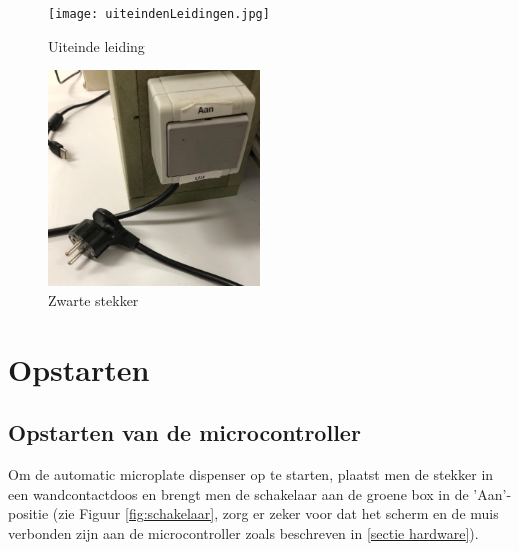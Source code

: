\documentclass[a4paper,twoside,kulak]{kulakreport} %
\begin{document}
\begin{figure}[h]
	\centering
	\texttt{[image: uiteindenLeidingen.jpg]}
	\caption{Uiteinde leiding}
	\label{fig: uiteinde leiding}
	
\end{figure} 

\begin{figure}[h]
	\centering
	\includegraphics[width=0.5\textwidth]{stekker.png}
	\caption{Zwarte stekker}
	\label{fig:stekker}
	
\end{figure} 


\chapter*{Opstarten}
\label{hoofdstuk opstarten}
\section*{Opstarten van de microcontroller}
Om de automatic microplate dispenser op te starten, plaatst men de stekker in een wandcontactdoos en brengt men de schakelaar aan de groene box in de 'Aan'-positie (zie Figuur \ref{fig:schakelaar}, zorg er zeker voor dat het scherm en de muis verbonden zijn aan de microcontroller zoals beschreven in \ref{sectie hardware}).
\end{document}

